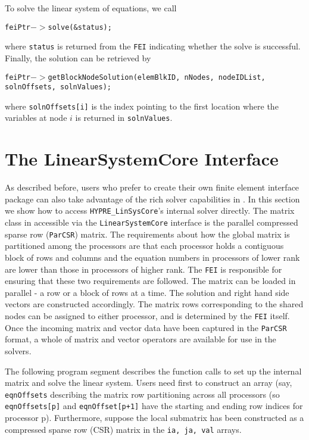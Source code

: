 To solve the linear system of equations, we call
\begin{tabbing}
\hspace{0.5in} \= {\tt feiPtr$->$solve(\&status);}
\end{tabbing}
where {\tt status} is returned from the {\tt FEI} indicating whether
the solve is successful. Finally, the solution can be retrieved by
\begin{tabbing}
\hspace{0.5in} \= {\tt feiPtr$->$getBlockNodeSolution(elemBlkID, nNodes, nodeIDList, solnOffsets, solnValues);}
\end{tabbing}
where {\tt solnOffsets[i]} is the index pointing to the first location 
where the variables at node $i$ is returned in {\tt solnValues}.

\section{The LinearSystemCore Interface}
\label{LSI_overview}

As described before, users who prefer to create their own finite element
interface package can also take advantage of the rich solver capabilities
in \hypre{}. In this section we show how to access {\tt HYPRE\_LinSysCore}'s
internal solver directly.  
The matrix class in \hypre{} accessible via the {\tt LinearSystemCore} interface
is the parallel compressed sparse row ({\tt ParCSR}) matrix.  The
requirements about how the global matrix is partitioned among the
processors are that each processor holds a contiguous block of rows and columns
and the equation numbers in processors of lower rank are lower than those
in processors of higher rank.  The {\tt FEI} is responsible for ensuring
that these two requirements are followed. The matrix can be loaded in
parallel - a row or a block of rows at a time.  The solution and right
hand side vectors are constructed accordingly. The matrix rows corresponding
to the shared nodes can be assigned to either processor, and is determined
by the {\tt FEI} itself. Once the incoming matrix and vector data have
been captured in the \hypre{} {\tt ParCSR} format, a whole of matrix and
vector operators are available for use in the \hypre{} solvers.

The following program segment describes the function calls to set up
the internal matrix and solve the linear system.
Users need first to 
construct an array (say, {\tt eqnOffsets} describing the matrix row
partitioning across all processors (so {\tt eqnOffsets[p]} and
{\tt eqnOffset[p+1]} have the starting and ending row indices for processor
p). Furthermore, suppose the local submatrix has been constructed as a
compressed sparse row (CSR) matrix in the {\tt ia, ja, val} arrays. 

